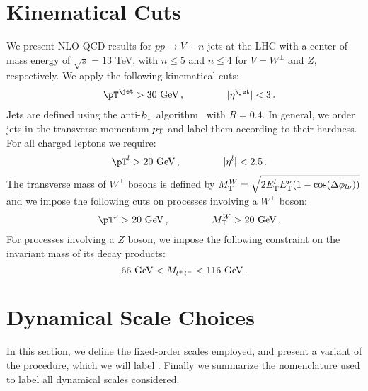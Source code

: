 \section{Kinematical Cuts}
\label{sec_kin}

We present NLO QCD results for $pp\rightarrow V+n$ jets at the
LHC with a center-of-mass energy of $\sqrt{s}=13$ TeV, with $n\le 5$ and $n\le 4$ for
$V=W^\pm$ and $Z$, respectively. We apply the following kinematical cuts:
\begin{eqnarray}
&& \pT^\jet > 30 \hbox{ GeV}\,, \hskip 1.5 cm 
|\eta^\jet|<3\,. 
\label{eq_jets}
\end{eqnarray}
Jets are defined using the anti-$k_{\textrm T}$
algorithm~\cite{antikT} with $R=0.4$. In general, we order jets in the transverse momentum $p_{\textrm T}$ and label them according to their hardness. For
all charged leptons we require:
\begin{eqnarray}
&& \pT^l > 20 \hbox{ GeV}\,, \hskip 1.5 cm 
|\eta^l|<2.5\,.
\label{eq_clep}
\end{eqnarray}
The transverse mass of $W^\pm$ bosons is defined by \mbox{$M_{\textrm
T}^W=\sqrt{2E_{\textrm T}^lE_{\textrm T}^\nu(1-\cos(\Delta
\phi_{l\nu}))}$} and we impose the following cuts on processes
involving a $W^\pm$ boson:
\begin{eqnarray}
&& \pT^\nu > 20 \hbox{ GeV}\,, \hskip 1.5 cm 
M_{\textrm T}^W>20 \hbox{ GeV}\,.
\label{eq_W}
\end{eqnarray}
For processes involving a $Z$ boson, we impose the following constraint on the
invariant mass of its decay products:
\begin{equation}
66 \hbox{ GeV}<M_{l^+l^-}<116 \hbox{ GeV}\,.
\label{eq_Z}
\end{equation}


\section{Dynamical Scale Choices}
\label{sec_scales}


In this section, we define the fixed-order scales employed,
and present a variant of the \MINLO{} \cite{MINLO} procedure, which we
will label \MINLOp{}. Finally we summarize the nomenclature used to label all dynamical scales considered.


